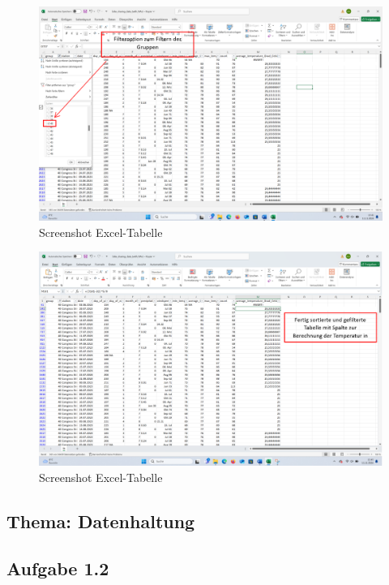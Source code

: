 \documentclass[a4paper, 12pt]{article}
\begin{document}
\newpage
\begin{figure}[!htb]
\centering
\includegraphics[scale=.4]{Screenshot 2024-11-26 201403}
\caption{Screenshot Excel-Tabelle}
\label{fig:Screenshot Excel-Tabelle}
\end{figure}

\begin{figure}[!htb]
\centering
\includegraphics[scale=.4]{Screenshot 2024-11-26 201421}
\caption{Screenshot Excel-Tabelle}
\label{fig:Screenshot Excel-Tabelle}
\end{figure}

\newpage
\subsection*{Thema: Datenhaltung}
\subsection{Aufgabe 1.2}
\end{document}

